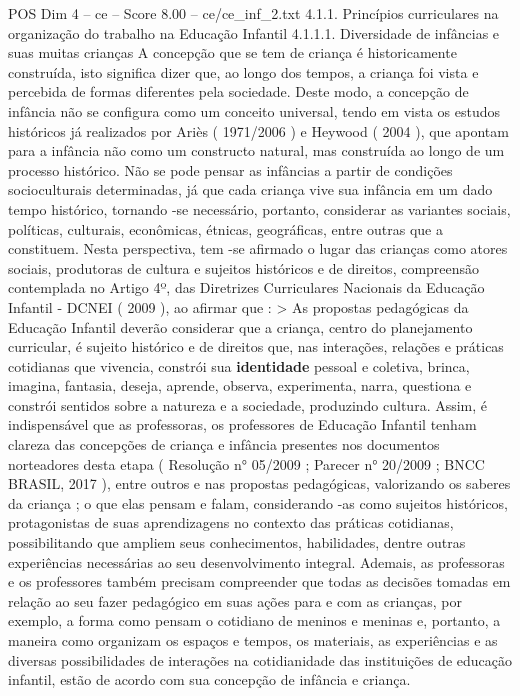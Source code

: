 \begin{textsample}{POS Dim 4 – ce – Score 8.00 – ce/ce\_inf\_2.txt}  \label{ex:f4_pos_137}
4.1.1.
Princípios curriculares na organização do trabalho na Educação Infantil 4.1.1.1.
Diversidade de infâncias e suas muitas crianças A concepção que se tem de criança é historicamente construída, isto significa dizer que, ao longo dos tempos, a criança foi vista e percebida de formas diferentes pela sociedade.
Deste modo, a concepção de infância não se configura como um conceito universal, tendo em vista os estudos históricos já realizados por Ariès ( 1971/2006 ) e Heywood ( 2004 ), que apontam para a infância não como um constructo natural, mas construída ao longo de um processo histórico.
Não se pode pensar as infâncias a partir de condições socioculturais determinadas, já que cada criança vive sua infância em um dado tempo histórico, tornando -se necessário, portanto, considerar as variantes sociais, políticas, culturais, econômicas, étnicas, geográficas, entre outras que a constituem.
Nesta perspectiva, tem -se afirmado o lugar das crianças como atores sociais, produtoras de cultura e sujeitos históricos e de direitos, compreensão contemplada no Artigo 4º, das Diretrizes Curriculares Nacionais da Educação Infantil - DCNEI ( 2009 ), ao afirmar que : > As propostas pedagógicas da Educação Infantil deverão considerar que a criança, centro do planejamento curricular, é sujeito histórico e de direitos que, nas interações, relações e práticas cotidianas que vivencia, constrói sua \textbf{identidade} pessoal e coletiva, brinca, imagina, fantasia, deseja, aprende, observa, experimenta, narra, questiona e constrói sentidos sobre a natureza e a sociedade, produzindo cultura.
Assim, é indispensável que as professoras, os professores de Educação Infantil tenham clareza das concepções de criança e infância presentes nos documentos norteadores desta etapa ( Resolução n{\EmojiFont °} 05/2009 ; Parecer n{\EmojiFont °} 20/2009 ; BNCC BRASIL, 2017 ), entre outros e nas propostas pedagógicas, valorizando os saberes da criança ; o que elas pensam e falam, considerando -as como sujeitos históricos, protagonistas de suas aprendizagens no contexto das práticas cotidianas, possibilitando que ampliem seus conhecimentos, habilidades, dentre outras experiências necessárias ao seu desenvolvimento integral.
Ademais, as professoras e os professores também precisam compreender que todas as decisões tomadas em relação ao seu fazer pedagógico em suas ações para e com as crianças, por exemplo, a forma como pensam o cotidiano de meninos e meninas e, portanto, a maneira como organizam os espaços e tempos, os materiais, as experiências e as diversas possibilidades de interações na cotidianidade das instituições de educação infantil, estão de acordo com sua concepção de infância e criança.

\end{textsample}
